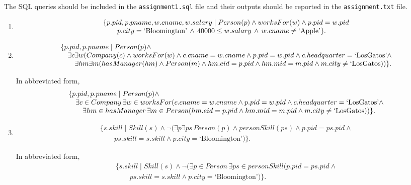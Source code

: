 \documentclass{article}
\begin{document}
The SQL queries should be included in the {\tt assignment1.sql} file and their outputs should be reported in the
{\tt assignment.txt} file.

\begin{enumerate}[resume]
\item 
{\small
\[
\begin{array}{ll}
\{p.pid, p.pname, w.cname, w.salary\mid Person(p) \land worksFor(w)\land p.pid = w.pid\\
\qquad p.city = \mbox{\rm `Bloomington'}\, \land\, 40000 \leq w.salary\, \land\, w.cname \neq \mbox{\rm `Apple'}\}.
\end{array}
\]
}


\item 
{\small
\[
\begin{array}{ll}
\{p.pid, p.pname\mid Person(p) \land \\
\quad \exists c \exists w (Company(c) \land worksFor(w) \land c.cname = w.cname \land p.pid = w.pid \land c.headquarter = \mbox{\rm `LosGatos'} \land \\
\quad \quad \exists hm \exists m (hasManager(hm) \land Person(m)\land 
 hm.eid = p.pid \land hm.mid = m.pid \land m.city \neq \mbox{\rm `LosGatos}))\}.
\end{array}
\]
}

In abbreviated form,
{\small
\[
\begin{array}{ll}
\{p.pid, p.pname\mid Person(p) \land \\
\quad \exists c\in Company\, \exists w\in worksFor (c.cname = w.cname \land p.pid = w.pid \land c.headquarter = \mbox{\rm `LosGatos'} \land \\
\quad \quad \exists hm\in hasManager\, \exists m\in Person (hm.eid = p.pid \land hm.mid = m.pid \land m.city \neq \mbox{\rm `LosGatos}))\}.
\end{array}
\]
}

\item 
{\small
\[
\begin{array}{ll}
\{s.skill\mid Skill(s) \land \lnot (\exists p\exists ps\, Person(p) \land personSkill(ps)\land  p.pid = ps.pid\land \\
\qquad ps.skill = s.skill \land p.city = \mbox{`Bloomington'})\}.
\end{array}
\]
}

In abbreviated form,
{\small
\[
\begin{array}{ll}
\{s.skill\mid Skill(s) \land \lnot (\exists p\in Person\, \exists ps\in personSkill (p.pid = ps.pid\land \\
\qquad ps.skill = s.skill \land p.city = \mbox{`Bloomington'})\}.
\end{array}
\]
}


\end{enumerate}
\end{document}
